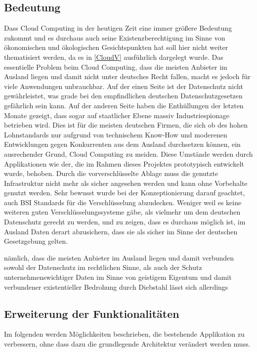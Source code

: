\documentclass[12pt,a4paper,bibliography=totocnumbered,listof=totocnumbered]{scrartcl}
\begin{document}
\subsection{Bedeutung}
Dass Cloud Computing in der heutigen Zeit eine immer größere Bedeutung zukommt und es durchaus auch seine Existenzberechtigung im Sinne von ökonomischen und ökologischen Gesichtspunkten hat soll hier nicht weiter thematisiert werden, da es in \ref{CloudV} ausführlich dargelegt wurde. Das essentielle Problem beim Cloud Computing, dass die meisten Anbieter im Ausland liegen und damit nicht unter deutsches Recht fallen, macht es jedoch für viele Anwendungen unbrauchbar. Auf der einen Seite ist der Datenschutz nicht gewährleistet, was grade bei den empfindlichen deutschen Datenschutzgesetzen gefährlich sein kann. Auf der anderen Seite haben die Enthüllungen der letzten Monate gezeigt, dass sogar auf staatlicher Ebene massiv Industriespionage betrieben wird. Dies ist für die meisten deutschen Firmen, die sich ob des hohen Lohnstandards nur aufgrund von technischem Know-How und moderenen Entwicklungen gegen Konkurrenten aus dem Ausland durchsetzen können, ein ausrechender Grund, Cloud Computing zu meiden. Diese Umstände werden durch Applikationen wie der, die im Rahmen dieses Projektes prototypisch entwickelt wurde, behoben. Durch die vorverschlüsselte Ablage muss die genutzte Infrastruktur nicht mehr als sicher angesehen werden und kann ohne Vorbehalte genutzt werden. Sehr bewusst wurde bei der Konzeptionierung darauf geachtet, auch BSI Standards für die Verschlüsselung abzudecken. Weniger weil es keine weiteren guten Verschlüsselungssysteme gäbe, als vielmehr um dem deutschen Datenschutz gerecht zu werden, und zu zeigen, dass es durchaus möglich ist, im Ausland Daten derart abzusichern, dass sie als sicher im Sinne der deutschen Gesetzgebung gelten.

nämlich, dass die meisten Anbieter im Ausland liegen und damit verbunden sowohl der Datenschutz im rechtlichen Sinne,  als auch der Schutz unternehmenswichtiger Daten im Sinne von geistigem Eigentum und damit verbundener existentieller Bedrohung durch Diebstahl lässt sich allerdings 
\subsection{Erweiterung der Funktionalitäten}
Im folgenden werden Möglichkeiten beschrieben, die bestehende Applikation zu verbessern, ohne dass dazu die grundlegende Architektur verändert werden muss.
\end{document}

